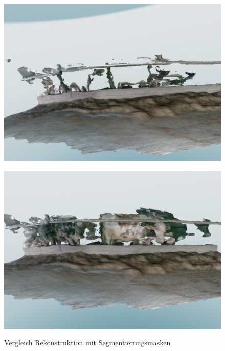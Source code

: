 \documentclass[12pt,DIV=15,BCOR=15mm,twoside,headsepline,abstract=true,listof=totoc,bibliography=totoc]{scrreprt}
\theoremstyle{remark}    %
\begin{document}
    \begin{figure}[ht]
        \centering
        \begin{minipage}{0.45\textwidth}
            \centering
            \includegraphics[width=\textwidth]{pics/recon_cow_maskout.png}
            \label{fig:recon_cow_maskout}
        \end{minipage}
        \hfill
        \begin{minipage}{0.45\textwidth}
            \centering
            \includegraphics[width=\textwidth]{pics/recon_cow_raw.png}
            \label{fig:recon_cow_raw}
        \end{minipage}
        \caption{Vergleich Rekonstruktion mit Segmentierungsmasken}
        \label{fig:recon_cow}
    \end{figure}
\end{document}
